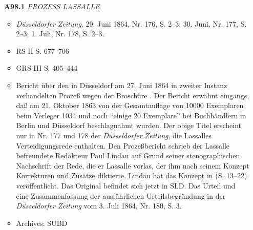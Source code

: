 \begin{itemize}
    \item[\textbf{A98.1}] \textit{PROZESS LASSALLE}
    \begin{itemize}
        \item \textit{Düsseldorfer Zeitung}, 29. Juni 1864, Nr. 176, S. 2--3; 30. Juni, Nr. 177, S. 2--3; 1. Juli, Nr. 178, S. 2--3.
        \item RS II S. 677--706
        \item GRS III S. 405--444 
        \item Bericht über den in Düsseldorf am 27. Juni 1864 in zweiter Instanz verhandelten Prozeß wegen der Broschüre . Der Bericht erwähnt eingangs, daß am 21. Oktober 1863 von der Gesamtauflage von 10000 Exemplaren beim Verleger 1034 und noch ``einige 20 Exemplare'' bei Buchhändlern in Berlin und Düsseldorf beschlagnahmt wurden. Der obige Titel erscheint nur in Nr. 177 und 178 der \textit{Düsseldorfer Zeitung}, die Lassalles Verteidigungsrede enthalten. Den Prozeßbericht schrieb der Lassalle befreundete Redakteur Paul Lindau auf Grund seiner stenographischen Nachschrift der Rede, die er Lassalle vorlas, der ihm nach seinem Konzept Korrekturen und Zusätze diktierte. Lindau hat das Konzept in  (S. 13--22) veröffentlicht. Das Original befindet sich jetzt in SLD. Das Urteil und eine Zusammenfassung der ausführlichen Urteilsbegründung in der \textit{Düsseldorfer Zeitung} vom 3. Juli 1864, Nr. 180, S. 3.
        \item Archives: SUBD
    \end{itemize}
    

\end{itemize}
